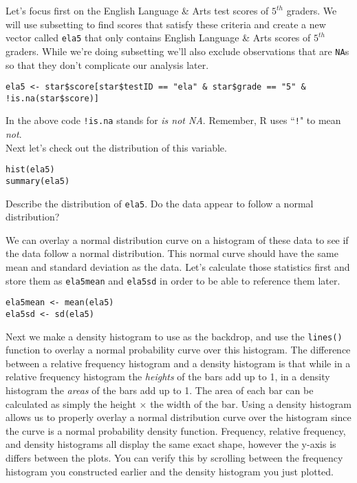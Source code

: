 \documentclass[11pt]{article}
\begin{document}
Let's focus first on the English Language \& Arts test scores of $5^{th}$ graders. We will use subsetting to find scores that satisfy these criteria and create a new vector called \texttt{ela5} that only contains English Language \& Arts scores of $5^{th}$ graders. While we're doing subsetting we'll also exclude observations that are \texttt{NA}s so that they don't complicate our analysis later.

\begin{lstlisting}
ela5 <- star$score[star$testID == "ela" & star$grade == "5" & !is.na(star$score)]
\end{lstlisting}

In the above code \texttt{!is.na} stands for \textit{is not NA}. Remember, R uses ``\texttt{!}" to mean \textit{not}. \\

Next let's check out the distribution of this variable.

\begin{lstlisting}
hist(ela5) 
summary(ela5)
\end{lstlisting}

\begin{exercise}
Describe the distribution of \texttt{ela5}. Do the data appear to follow a normal distribution?
\end{exercise}

We can overlay a normal distribution curve on a histogram of these data to see if the data follow a normal distribution. This normal curve should have the same mean and standard deviation as the data. Let's calculate those statistics first and store them as \texttt{ela5mean} and \texttt{ela5sd} in order to be able to reference them later.

\begin{lstlisting}
ela5mean <- mean(ela5)
ela5sd <- sd(ela5)
\end{lstlisting}

Next we make a density histogram to use as the backdrop, and use the \texttt{lines()} function to overlay a normal probability curve over this histogram. The difference between a relative frequency histogram and a density histogram is that while in a relative frequency histogram the \textit{heights} of the bars add up to 1, in a density histogram the \textit{areas} of the bars add up to 1. The area of each bar can be calculated as simply the height $\times$ the width of the bar. Using a density histogram allows us to properly overlay a normal distribution curve over the histogram since the curve is a normal probability density function. Frequency, relative frequency, and density histograms all display the same exact shape, however the y-axis is differs between the plots. You can verify this by scrolling between the frequency histogram you constructed earlier and the density histogram you just plotted.
\end{document}
